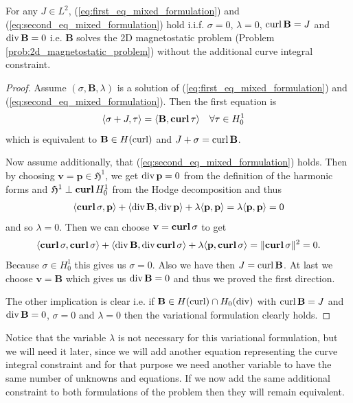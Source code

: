 \documentclass[../master_thesis.tex]{subfiles}
\begin{document}
\begin{proposition}
    For any $J \in L^2$, (\ref{eq:first_eq_mixed_formulation}) and 
    (\ref{eq:second_eq_mixed_formulation}) hold i.i.f. 
    $\sigma = 0$, $\lambda=0$, $\curl \mathbf{B} = J$ and 
    $\diver \mathbf{B} = 0$
    i.e. $\mathbf{B}$ solves the 2D magnetostatic problem (Problem\,\ref{prob:2d_magnetostatic_problem})  
    without the additional curve integral
    constraint.
\end{proposition}
\begin{proof}
    Assume $(\sigma,\mathbf{B},\lambda)$ is a solution of (\ref{eq:first_eq_mixed_formulation}) and 
    (\ref{eq:second_eq_mixed_formulation}). Then the first equation is
    \begin{align*}
        \langle \sigma + J, \tau \rangle  
        &=  \langle \mathbf{B}, \veccurl\tau \rangle  \quad \forall \tau \in H^1_0
    \end{align*}
    which is equivalent to $\mathbf{B} \in H(\curl)$ and $J + \sigma = \curl \mathbf{B}$.

    Now assume additionally, that  
    (\ref{eq:second_eq_mixed_formulation}) holds. Then by choosing $\mathbf{v} = \mathbf{p} \in \mathfrak{H}^1$,
    we get $\diver \mathbf{p} = 0$ from the definition of the harmonic forms 
    and $\mathfrak{H}^1 \perp \veccurl H^1_0$ from the Hodge decomposition and thus
    \begin{align*}
        \langle \veccurl \sigma, \mathbf{p} \rangle + \langle \diver \mathbf{B}, \diver\mathbf{p}\rangle 
            + \lambda\langle \mathbf{p}, \mathbf{p} \rangle
        = \lambda \langle \mathbf{p}, \mathbf{p}\rangle = 0
    \end{align*}
    and so $\lambda = 0$. Then we can choose $\mathbf{v} = \veccurl \sigma$ to get 
    \begin{align*}
        \langle \veccurl \sigma, \veccurl \sigma \rangle + \langle \diver \mathbf{B}, \diver \veccurl \sigma \rangle 
            + \lambda \langle \mathbf{p}, \veccurl \sigma \rangle
        = \lVert \veccurl \sigma \rVert^2 = 0.
    \end{align*}
    Because $\sigma \in H^1_0$ this gives us $\sigma = 0$. Also we have then 
    $J = \curl \mathbf{B}$. At last we choose $\mathbf{v} = \mathbf{B}$ which gives us 
    $\diver \mathbf{B} = 0$ and thus we proved the first direction. 

    The other implication is clear i.e. if $\mathbf{B} \in H(\curl) \cap H_0(\diver)$
    with $\curl \mathbf{B} = J$ and $\diver \mathbf{B} = 0$, $\sigma=0$ and $\lambda = 0$ then the variational 
    formulation clearly holds.
    \end{proof}
Notice that the variable $\lambda$ is not necessary for this variational formulation, 
but we will need it later, since we will add another equation representing the 
curve integral constraint and for that purpose we need another variable to have the same 
number of unknowns and equations.
If we now add the same additional constraint to both formulations of the problem 
then they will remain equivalent.
\end{document}
